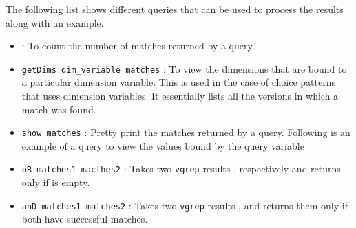 The following list shows different queries that can be used to process the  results along with an example.
\begin{itemize}
\item {} : To count the number of matches returned by a query.
\item \texttt{getDims dim_variable matches} : To view the dimensions that are bound to a particular dimension variable. This is used in the case of choice patterns that uses dimension variables. It essentially lists all the versions in which a match was found.
\item \texttt{show matches} : Pretty print the matches returned by a query. Following is an example of a query to view the values bound by the query variable 
\item \texttt{oR matches1 macthes2} : Takes two \texttt{vgrep} results ,  respectively and returns  only if  is empty.
\item \texttt{anD matches1 matches2} : Takes two \texttt{vgrep} results ,  and returns them only if both have successful matches.
\end{itemize}
